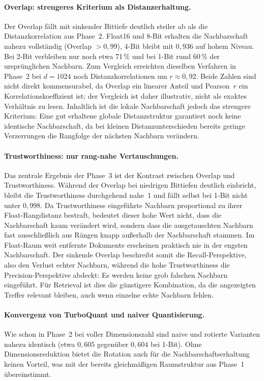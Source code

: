 \paragraph{Overlap: strengeres Kriterium als Distanzerhaltung.}
Der Overlap fällt mit sinkender Bittiefe deutlich steiler ab als die Distanzkorrelation aus Phase~2.
Float16 und 8-Bit erhalten die Nachbarschaft nahezu vollständig (Overlap $> 0{,}99$), 4-Bit bleibt mit $0{,}936$ auf hohem Niveau.
Bei 2-Bit verbleiben nur noch etwa 71\,\% und bei 1-Bit rund 60\,\% der ursprünglichen Nachbarn.
Zum Vergleich erreichten dieselben Verfahren in Phase~2 bei $d = 1024$ noch Distanzkorrelationen um $r \approx 0{,}92$.
Beide Zahlen sind nicht direkt kommensurabel, da Overlap ein linearer Anteil und Pearson~$r$ ein Korrelationskoeffizient ist; der Vergleich ist daher illustrativ, nicht als exaktes Verhältnis zu lesen.
Inhaltlich ist die lokale Nachbarschaft jedoch das strengere Kriterium: Eine gut erhaltene globale Distanzstruktur garantiert noch keine identische Nachbarschaft, da bei kleinen Distanzunterschieden bereits geringe Verzerrungen die Rangfolge der nächsten Nachbarn verändern.
%
\paragraph{Trustworthiness: nur rang-nahe Vertauschungen.}
Das zentrale Ergebnis der Phase~3 ist der Kontrast zwischen Overlap und Trustworthiness.
Während der Overlap bei niedrigen Bittiefen deutlich einbricht, bleibt die Trustworthiness durchgehend nahe~1 und fällt selbst bei 1-Bit nicht unter $0{,}998$.
Da Trustworthiness eingeführte Nachbarn proportional zu ihrer Float-Rangdistanz bestraft, bedeutet dieser hohe Wert nicht, dass die Nachbarschaft kaum verändert wird, sondern dass die ausgetauschten Nachbarn fast ausschließlich aus Rängen knapp außerhalb der Nachbarschaft stammen.
Im Float-Raum weit entfernte Dokumente erscheinen praktisch nie in der engsten Nachbarschaft.
Der sinkende Overlap beschreibt somit die Recall-Perspektive, also den Verlust echter Nachbarn, während die hohe Trustworthiness die Precision-Perspektive abdeckt: Es werden keine grob falschen Nachbarn eingeführt.
Für Retrieval ist dies die günstigere Kombination, da die angezeigten Treffer relevant bleiben, auch wenn einzelne echte Nachbarn fehlen.
%
\paragraph{Konvergenz von TurboQuant und naiver Quantisierung.}
Wie schon in Phase~2 bei voller Dimensionszahl sind naive und rotierte Varianten nahezu identisch (etwa $0{,}605$ gegenüber $0{,}604$ bei 1-Bit).
Ohne Dimensionsreduktion bietet die Rotation auch für die Nachbarschaftserhaltung keinen Vorteil, was mit der bereits gleichmäßigen Raumstruktur aus Phase~1 übereinstimmt.
%
